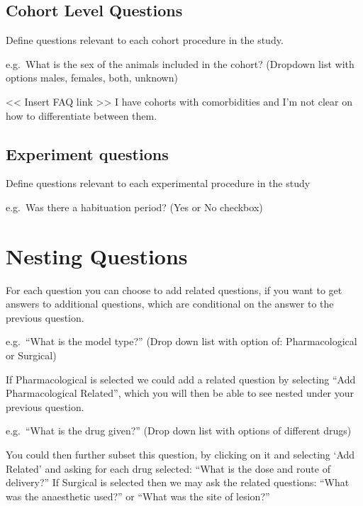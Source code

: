 \documentclass[
]{book}
\begin{document}
\hypertarget{cohort-level-questions}{%
\subsection{Cohort Level Questions}\label{cohort-level-questions}}

Define questions relevant to each cohort procedure in the study.

e.g.~What is the sex of the animals included in the cohort?
(Dropdown list with options males, females, both, unknown)

\textless{}\textless{} Insert FAQ link \textgreater{}\textgreater{}
I have cohorts with comorbidities and I'm not clear on how to differentiate between them.

\hypertarget{experiment-questions}{%
\subsection{Experiment questions}\label{experiment-questions}}

Define questions relevant to each experimental procedure in the study

e.g.~Was there a habituation period?
(Yes or No checkbox)

\hypertarget{nesting-questions}{%
\section{Nesting Questions}\label{nesting-questions}}

For each question you can choose to add related questions, if you want to get answers to additional questions, which are conditional on the answer to the previous question.

e.g.~``What is the model type?''
(Drop down list with option of: Pharmacological or Surgical)

If Pharmacological is selected we could add a related question by selecting ``Add Pharmacological Related'', which you will then be able to see nested under your previous question.

e.g.~``What is the drug given?''
(Drop down list with options of different drugs)

You could then further subset this question, by clicking on it and selecting `Add Related' and asking for each drug selected: ``What is the dose and route of delivery?''
If Surgical is selected then we may ask the related questions: ``What was the anaesthetic used?'' or ``What was the site of lesion?''
\end{document}
